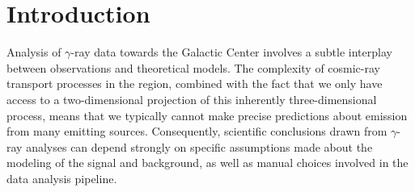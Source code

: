 \documentclass{article}
\theoremstyle{plain}
\theoremstyle{definition}
\theoremstyle{remark}
\begin{document}
\printAffiliationsAndNotice{\icmlEqualContribution} %

\begin{abstract}
    We motivate the use of differentiable probabilistic programming techniques in order to account for the large model-space inherent to astrophysical $\gamma$-ray analyses. Targeting the longstanding Galactic Center $\gamma$-ray Excess (GCE) puzzle, we construct a differentiable forward model and likelihood that makes liberal use of GPU acceleration and vectorization in order to simultaneously account for a continuum of possible spatial morphologies consistent with the Excess emission in a fully probabilistic manner. Our setup allows for efficient inference over the large model space using variational methods. Beyond application to $\gamma$-ray data, a goal of this work is to showcase how differentiable probabilistic programming can be used as a tool to enable flexible analyses of astrophysical datasets.
\end{abstract}

\section{Introduction} 

Analysis of $\gamma$-ray data towards the Galactic Center involves a subtle interplay between observations and theoretical models. The complexity of cosmic-ray transport processes in the region, combined with the fact that we only have access to a two-dimensional projection of this inherently three-dimensional process, means that we typically cannot make precise predictions about emission from many emitting sources. Consequently, scientific conclusions drawn from $\gamma$-ray analyses can depend strongly on specific assumptions made about the modeling of the signal and background, as well as manual choices involved in the data analysis pipeline.
\end{document}
